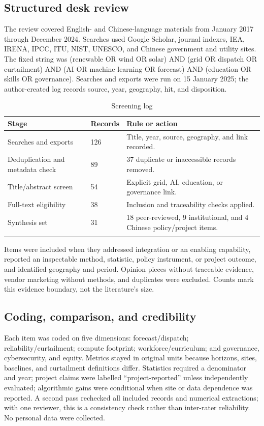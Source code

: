 \documentclass[12pt]{article}
\begin{document}
\subsection{Structured desk review}
The review covered English- and Chinese-language materials from January 2017 through December 2024. Searches used Google Scholar, journal indexes, IEA, IRENA, IPCC, ITU, NIST, UNESCO, and Chinese government and utility sites. The fixed string was (renewable OR wind OR solar) AND (grid OR dispatch OR curtailment) AND (AI OR machine learning OR forecast) AND (education OR skills OR governance). Searches and exports were run on 15 January 2025; the author-created log records source, year, geography, hit, and disposition.

\begin{table}[H]\small
\caption{Screening log}\label{tab:screening}
\begin{tabularx}{\textwidth}{@{}L{0.48\textwidth}C{0.16\textwidth}Y@{}}
\toprule
\textbf{Stage} & \textbf{Records} & \textbf{Rule or action}\\
\midrule
Searches and exports & 126 & Title, year, source, geography, and link recorded.\\
Deduplication and metadata check & 89 & 37 duplicate or inaccessible records removed.\\
Title/abstract screen & 54 & Explicit grid, AI, education, or governance link.\\
Full-text eligibility & 38 & Inclusion and traceability checks applied.\\
Synthesis set & 31 & 18 peer-reviewed, 9 institutional, and 4 Chinese policy/project items.\\
\bottomrule
{}
\end{tabularx}
\end{table}


Items were included when they addressed integration or an enabling capability, reported an inspectable method, statistic, policy instrument, or project outcome, and identified geography and period. Opinion pieces without traceable evidence, vendor marketing without methods, and duplicates were excluded. Counts mark this evidence boundary, not the literature's size.



\subsection{Coding, comparison, and credibility}
Each item was coded on five dimensions: forecast/dispatch; reliability/curtailment; compute footprint; workforce/curriculum; and governance, cybersecurity, and equity. Metrics stayed in original units because horizons, sites, baselines, and curtailment definitions differ. Statistics required a denominator and year; project claims were labelled ``project-reported'' unless independently evaluated; algorithmic gains were conditional when site or data dependence was reported. A second pass rechecked all included records and numerical extractions; with one reviewer, this is a consistency check rather than inter-rater reliability. No personal data were collected.
\end{document}
